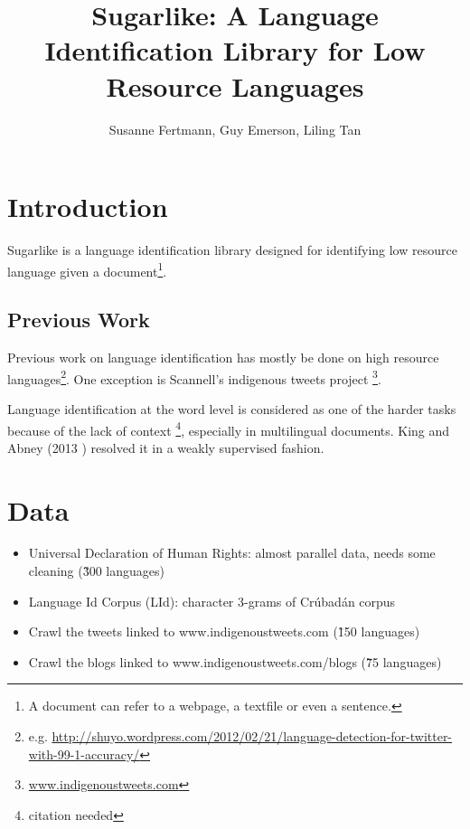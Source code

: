 \documentclass[11pt]{article}
\title{\textbf{Sugarlike: A Language Identification Library for Low Resource Languages}}
\author{Susanne Fertmann, Guy Emerson, Liling Tan}
\date{}
\begin{document}
\maketitle

\section{Introduction}

Sugarlike is a language identification library designed for identifying low resource language given a document\footnote{A document can refer to a webpage, a textfile or even a sentence.}.


\subsection{Previous Work}

Previous work on language identification has mostly be done on high resource languages\footnote{e.g. \href{http://shuyo.wordpress.com/2012/02/21/language-detection-for-twitter-with-99-1-accuracy/}{http://shuyo.wordpress.com/2012/02/21/language-detection-for-twitter-with-99-1-accuracy/}}. One exception is Scannell's indigenous tweets project \footnote{\href{www.indigenoustweets.com}{www.indigenoustweets.com}}. %

Language identification at the word level is considered as one of the harder tasks because of the lack of context \footnote{citation needed}, especially in multilingual documents. King and Abney (2013 \cite{king-abney:2013}) resolved it in a weakly supervised fashion.


\section{Data}


\begin{itemize}
\item Universal Declaration of Human Rights: almost parallel data,  needs some cleaning (\~300 languages)
\item Language Id Corpus (LId): character 3-grams of Crúbadán corpus %
\item Crawl the tweets linked to www.indigenoustweets.com (\~150 languages)
\item Crawl the blogs linked to www.indigenoustweets.com/blogs (\~75 languages)
\end{itemize}
\end{document}
